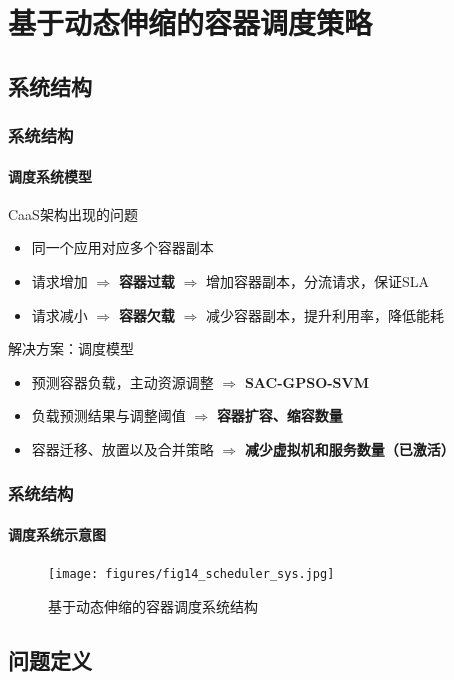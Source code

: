 \section{基于动态伸缩的容器调度策略}

\subsection{系统结构}

\begin{frame}
\frametitle{系统结构}
\framesubtitle{调度系统模型}
\begin{block}{CaaS架构出现的问题}
\begin{itemize}
    \item 同一个应用对应多个容器副本
    \item 请求增加 $\Rightarrow$ \textbf{容器过载} $\Rightarrow$ 增加容器副本，分流请求，保证SLA
    \item 请求减小 $\Rightarrow$ \textbf{容器欠载} $\Rightarrow$ 减少容器副本，提升利用率，降低能耗
\end{itemize}
\end{block}
\begin{exampleblock}{解决方案：调度模型}
\begin{itemize}
    \item {\color{gray}预测容器负载，主动资源调整 $\Rightarrow$ \textbf{SAC-GPSO-SVM}}
    \item 负载预测结果与调整阈值 $\Rightarrow$ \textbf{容器扩容、缩容数量}
    \item 容器迁移、放置以及合并策略 $\Rightarrow$ \textbf{减少虚拟机和服务数量（已激活）}
\end{itemize}
\end{exampleblock}
\end{frame}

\begin{frame}
\frametitle{系统结构}
\framesubtitle{调度系统示意图}
\begin{figure}[htb]
    \centering
    \texttt{[image: figures/fig14\_scheduler\_sys.jpg]}
    \caption{基于动态伸缩的容器调度系统结构}
    \label{fig:fig14}
\end{figure}
\bigskip
\end{frame}

\subsection{问题定义}

